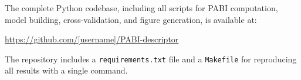 \documentclass[12pt,a4paper]{article}
\begin{document}
\noindent The complete Python codebase, including all scripts for PABI computation, model building, cross-validation, and figure generation, is available at:

\begin{center}
\url{https://github.com/[username]/PABI-descriptor}
\end{center}

\noindent The repository includes a \texttt{requirements.txt} file and a \texttt{Makefile} for reproducing all results with a single command.
\end{document}
